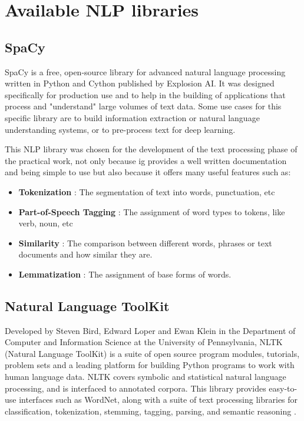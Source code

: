        
\section{Available NLP libraries}
    \label{sec:libraries}

        \subsection{SpaCy}
        
        \par SpaCy is a free, open-source library for advanced natural language processing written in Python and Cython published by Explosion AI. It was designed specifically for production use and to help in the building of applications that process and "understand" large volumes of text data.  Some use cases for this specific library are to build information extraction or natural language understanding systems, or to pre-process text for deep learning. \cite{Spacy2017}

        \par This NLP library was chosen for the development of the text processing phase of the practical work, not only because ig provides a well written documentation and being simple to use but also because it offers many useful features such as:

        \begin{itemize}
            \item \textbf{Tokenization} : The segmentation of text into words, punctuation, etc
            \item \textbf{Part-of-Speech Tagging} : The assignment of word types to tokens, like verb, noun, etc
            \item \textbf{Similarity} : The comparison between different words, phrases or text documents and how similar they are.
            \item \textbf{Lemmatization} : The assignment of base forms of words.
        \end{itemize}

      

        \subsection{Natural Language ToolKit}

        \par Developed by Steven Bird, Edward Loper and Ewan Klein in the Department of Computer and Information Science at the University of Pennsylvania, NLTK (Natural Language ToolKit) is a suite of open source program modules, tutorials, problem sets and a leading platform for building Python programs to work with human language data. NLTK covers symbolic and statistical natural language processing, and is interfaced to annotated corpora. This library provides easy-to-use interfaces such as WordNet, along with a suite of text processing libraries for classification, tokenization, stemming, tagging, parsing, and semantic reasoning \cite{Loper2002}. 

